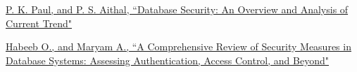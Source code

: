 \documentclass[12pt]{book} %
\begin{document}
\renewcommand\bibname{References} %
\begin{thebibliography}{1}

      \hyperref[sec:db_security_an_overview_and_analysis_of_current_trend_1]{P. K. Paul, and P. S. Aithal, ``Database Security: An Overview and Analysis of Current Trend"} 

      \hyperref[sec:a_comprve_rev_of_sec_measr_in_db_sys_assess_auth_accss_ctrl_bynd_1]{Habeeb O., and Maryam
A., ``A Comprehensive Review of Security Measures in Database Systems: Assessing Authentication, Access Control, and Beyond"} 

   

    
    
    
    
    
  
\end{thebibliography}
  
\end{document}
